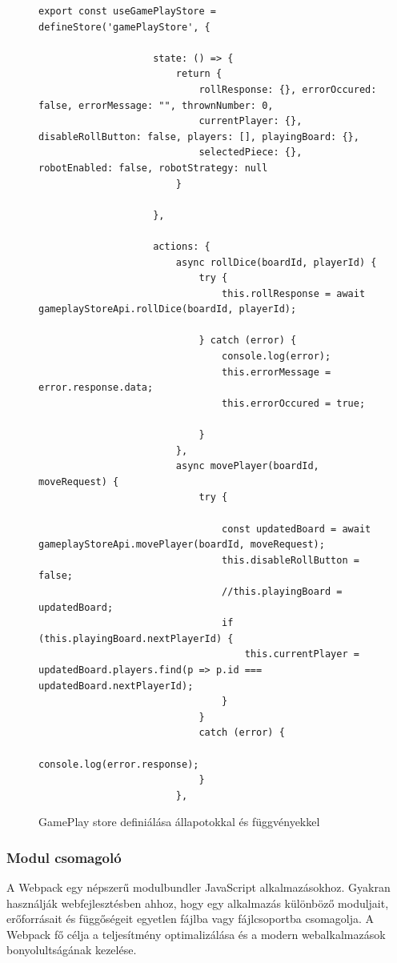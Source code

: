 \documentclass[a4paper,twoside]{article}
\begin{document}
\begin{figure}
	\caption{GamePlay store definiálása állapotokkal és függvényekkel}
	\begin{adjustwidth}{0cm}{10cm}
		\begin{minipage}{\textwidth}
			\begin{lstlisting}[style=javascriptStyle]
				export const useGamePlayStore = defineStore('gamePlayStore', {
					
					state: () => {
						return {
							rollResponse: {}, errorOccured: false, errorMessage: "", thrownNumber: 0,
							currentPlayer: {}, disableRollButton: false, players: [], playingBoard: {},
							selectedPiece: {}, robotEnabled: false, robotStrategy: null
						}
						
					},
					
					actions: {
						async rollDice(boardId, playerId) {
							try {
								this.rollResponse = await gameplayStoreApi.rollDice(boardId, playerId);
								
							} catch (error) {
								console.log(error);
								this.errorMessage = error.response.data;
								this.errorOccured = true;
								
							}
						},
						async movePlayer(boardId, moveRequest) {
							try {
								
								const updatedBoard = await gameplayStoreApi.movePlayer(boardId, moveRequest);
								this.disableRollButton = false;
								//this.playingBoard = updatedBoard;
								if (this.playingBoard.nextPlayerId) {
									this.currentPlayer = updatedBoard.players.find(p => p.id === updatedBoard.nextPlayerId);
								}
							}
							catch (error) {
								console.log(error.response);
							}
						},
			\end{lstlisting}
		\end{minipage}
	\end{adjustwidth}
	\label{pinia}
\end{figure}
\subsubsection{Modul csomagoló}

A Webpack\cite{webpack} egy népszerű modulbundler JavaScript alkalmazásokhoz. Gyakran
használják webfejlesztésben ahhoz, hogy egy alkalmazás különböző moduljait,
erőforrásait és függőségeit egyetlen fájlba vagy fájlcsoportba csomagolja. A Webpack fő
célja a teljesítmény optimalizálása és a modern webalkalmazások bonyolultságának
kezelése.
\end{document}

